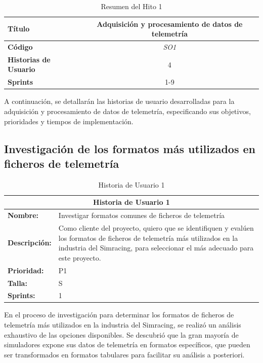 \begin{table}[H]
\centering
\begin{tabular}{|l|c|}
\hline
\textbf{Título} & Adquisición y procesamiento de datos de telemetría \\ \hline
\textbf{Código} & \textit{SO1} \\ \hline
\textbf{Historias de Usuario} & 4 \\ \hline
\textbf{Sprints} & 1-9 \\ \hline
\end{tabular}
\caption{Resumen del Hito 1}
\label{tab:resumen_hito_1}
\label{tab
}
\end{table}

A continuación, se detallarán las historias de usuario desarrolladas para la adquisición y procesamiento de datos de telemetría, especificando sus objetivos, prioridades y tiempos de implementación.

\subsection{Investigación de los formatos más utilizados en ficheros de telemetría}
\begin{table}[H]
\centering
\begin{tabular}{|l|p{10cm}|}
\hline
\multicolumn{2}{|c|}{\textbf{Historia de Usuario 1}} \\ \hline
\textbf{Nombre:} & Investigar formatos comunes de ficheros de telemetría \\ \hline
\textbf{Descripción:} & Como cliente del proyecto, quiero que se identifiquen y evalúen los formatos de ficheros de telemetría más utilizados en la industria del Simracing, para seleccionar el más adecuado para este proyecto. \\ \hline
\textbf{Prioridad:} & P1 \\ \hline
\textbf{Talla:} & S \\ \hline
\textbf{Sprints:} & 1 \\ \hline
\end{tabular}
\caption{Historia de Usuario 1}
\label{tab:us_telemetria}
\end{table}

En el proceso de investigación para determinar los formatos de ficheros de telemetría más utilizados en la industria del Simracing, se realizó un análisis exhaustivo de las opciones disponibles. Se descubrió que la gran mayoría de simuladores expone sus datos de telemetría en formatos específicos, que pueden ser transformados en formatos tabulares para facilitar su análisis a posteriori.

